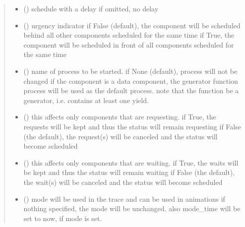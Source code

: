 \documentclass[letterpaper,10pt,english]{sphinxmanual}
\begin{document}
\begin{fulllineitems}
\begin{fulllineitems}
\begin{quote}
\begin{description}
\begin{itemize}
\item {} 
 () \textendash{} schedule with a delay 
if omitted, no delay

\item {} 
 () \textendash{} urgency indicator 
if False (default), the component will be scheduled
behind all other components scheduled
for the same time 
if True, the component will be scheduled
in front of all components scheduled
for the same time

\item {} 
 () \textendash{} name of process to be started. 
if None (default), process will not be changed 
if the component is a data component, the
generator function process will be used as the default process. 
note that the function  be a generator,
i.e. contains at least one yield.

\item {} 
 () \textendash{} this affects only components that are requesting. 
if True, the requests will be kept and thus the status will remain requesting 
if False (the default), the request(s) will be canceled and the status will become scheduled

\item {} 
 () \textendash{} this affects only components that are waiting. 
if True, the waits will be kept and thus the status will remain waiting 
if False (the default), the wait(s) will be canceled and the status will become scheduled

\item {} 
 () \textendash{} mode 
will be used in the trace and can be used in animations 
if nothing specified, the mode will be unchanged. 
also mode\_time will be set to now, if mode is set.

\end{itemize}

\end{description}\end{quote}


\end{fulllineitems}
\end{fulllineitems}
\end{document}
